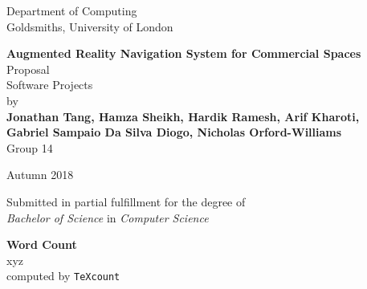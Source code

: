 \documentclass[12pt]{report}
\newcommand\blankpage{%
    \null
    \thispagestyle{empty}%
    \addtocounter{page}{-1}%
    \newpage}
\begin{document}
\begin{titlepage}
    \begin{center}
        \vspace*{1cm}
        Department of Computing\\
        Goldsmiths, University of London\\

        \vspace*{3.75cm}

        \textbf{\Large Augmented Reality Navigation System for Commercial Spaces}\\
        \vspace*{0.25cm}           
        Proposal\\
        Software Projects\\  

        \vspace*{2cm}
        by\\
        \vspace*{0.25cm}    
        \textbf{Jonathan Tang, Hamza Sheikh, Hardik Ramesh, Arif Kharoti,\\}
        \textbf{Gabriel Sampaio Da Silva Diogo, Nicholas Orford-Williams}\\
        \vspace*{0.1cm}    
        Group 14

        \vspace{2cm}

        Autumn 2018
        \vfill

        Submitted in partial fulfillment for the degree of\\
        \textit{Bachelor of Science} in \textit{Computer Science}

        \vspace{1.5cm}

    \end{center}
\end{titlepage}
\afterpage{\blankpage}
\thispagestyle{plain}

\begin{center}    
    \large
    \textbf{Word Count}\\
    xyz\\
    computed by \texttt{TeXcount}
\end{center}
\end{document}
